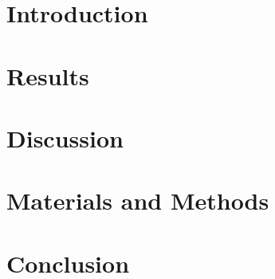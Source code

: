 \documentclass{article}
\begin{document}
\maketitle

\section{Introduction}

\blindtext

\section{Results}

\Blindtext

\section{Discussion}

\Blindtext

\section{Materials and Methods}

\blindtext

\section{Conclusion}

\blindtext
\end{document}
